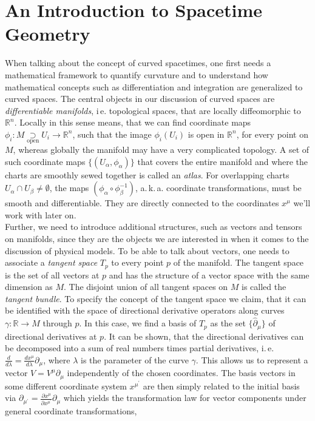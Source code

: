 \section{An Introduction to Spacetime Geometry}
 When talking about the concept of curved spacetimes, one first needs a mathematical framework to quantify curvature and to understand how mathematical concepts such as differentiation and integration are generalized to curved spaces. 
 The central objects in our discussion of curved spaces are \textit{differentiable manifolds}, i\,e. topological spaces, that are  locally diffeomorphic to $\mathbb{R}^n$. Locally in this sense means, that we can find coordinate maps $\phi_i: M \underset{\mathrm{open}}{\supset} U_i \rightarrow \mathbb{R}^n$, such that the image $\phi_i(U_i)$ is open in  $\mathbb{R}^n$, for every point on $M$, whereas globally the manifold may have a very complicated topology. A set of such coordinate maps $\{(U_{\alpha}, \phi_{\alpha})\}$ that covers the entire manifold and where the charts are smoothly sewed together is called an \textit{atlas}. For overlapping charts $U_{\alpha}\cap U_{\beta} \neq \emptyset$, the maps $(\phi_{\alpha} \circ \phi_{\beta}^{-1})$, a.\,k.\,a. coordinate transformations, must be smooth and differentiable. They are directly connected to the coordinates $x^{\mu}$ we'll work with later on. \\
Further, we need to introduce additional structures, such as vectors and tensors on manifolds, since they are the objects we are interested in when it comes to the discussion of physical models. To be able to talk about vectors, one needs to associate  a \textit{tangent space} $T_p$ to every point $p$ of the manifold. The tangent space is the set of all vectors at  $p$ and  has the structure of a vector space with the same dimension as $M$. The disjoint union of all tangent spaces on $M$ is called the \textit{tangent bundle}. To specify the concept of the tangent space we claim, that it can be identified with the space of directional derivative operators along curves $\gamma: \mathbb{R} \rightarrow M$  through $p$. In this case, we find a basis of $T_p$ as the set $\{\hat{\partial}_{\mu}\}$ of directional derivatives at $p$. It can be shown, that the directional derivatives can be decomposed into a sum of real numbers times partial derivatives, i.\,e. $\frac{d}{d \lambda} = \frac{d x^{\mu}}{d \lambda}\partial_{\mu}$, where $\lambda$ is the parameter of the curve $\gamma$. This allows us to represent a vector $V=V^{\mu}\partial_{\mu}$ independently of the chosen coordinates. The basis vectors in some different coordinate system $x^{\mu^{\prime}}$ are then simply related to the initial basis via $\partial_{\mu^{\prime}}=\frac{\partial x^{\mu}}{\partial x^{\mu^{\prime}}} \partial_{\mu}$ which yields the transformation law for vector components under general coordinate transformations,
